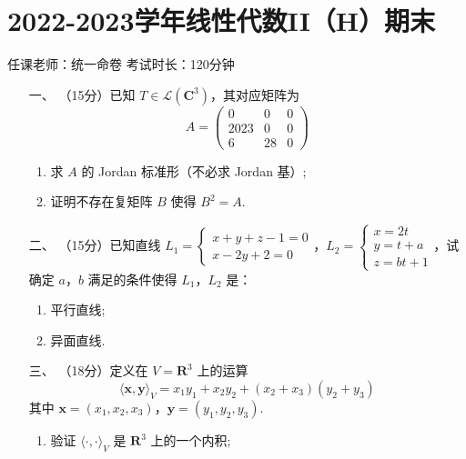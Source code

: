 \section*{2022-2023学年线性代数II（H）期末}

\begin{center}
    任课老师：统一命卷\hspace{4em} 考试时长：120分钟
\end{center}

\begin{enumerate}
	\item[一、]（15分）已知 $ T \in \mathcal{L}(\mathbf{C}^3) $，其对应矩阵为
    \[ A = \begin{pmatrix} 0 & 0 & 0 \\ 2023 & 0 & 0 \\ 6 & 28 & 0 \end{pmatrix} \]
    \begin{enumerate}[label=(\arabic*)]
        \item 求 $A$ 的 Jordan 标准形（不必求 Jordan 基）;
        \item 证明不存在复矩阵 $B$ 使得 $B^2 = A$.
    \end{enumerate}
	\item[二、]（15分）已知直线 $ L_1 = \begin{cases} x + y + z - 1 = 0 \\ x - 2y + 2 = 0 \end{cases} $，$ L_2 = \begin{cases} x = 2t \\ y = t + a \\ z = bt + 1 \end{cases} $，试确定 $ a $，$ b $ 满足的条件使得 $ L_1 $，$ L_2 $ 是：
	\begin{enumerate}[label=(\arabic*)]
        \item 平行直线;
        \item 异面直线.
    \end{enumerate}
	\item[三、]（18分）定义在 $ V = \mathbf{R}^3 $ 上的运算
    \[ \langle \boldsymbol{x}, \boldsymbol{y} \rangle_V = x_1 y_1 + x_2 y_2 + (x_2 + x_3)(y_2 + y_3) \]
    其中 $ \boldsymbol{x} = (x_1, x_2, x_3) $，$ \boldsymbol{y} = (y_1, y_2, y_3) $.
    \begin{enumerate}[label=(\arabic*)]
        \item 验证 $ \langle \cdot, \cdot \rangle_V $ 是 $ \mathbf{R}^3 $ 上的一个内积;

\end{enumerate}
\end{enumerate}
